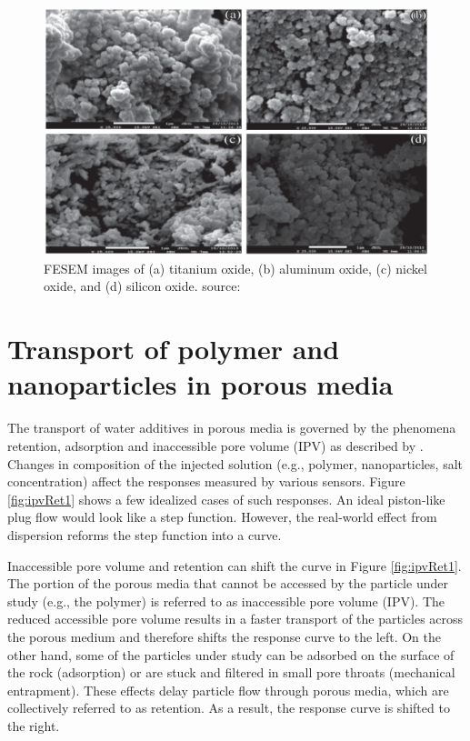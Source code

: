 \begin{figure}
    \centering
    \includegraphics[width=\textwidth]{img/fig/npFesem.png}
    \caption{FESEM images of (a) titanium oxide, (b) aluminum oxide, (c) nickel oxide, and (d) silicon oxide. source: \citet{Alomair2015} }
    \label{fig:npFesem}
\end{figure}



\section{Transport of polymer and nanoparticles in porous media}
The transport of water additives in porous media  is governed by the phenomena  retention, adsorption  and inaccessible pore volume  (IPV) as described by \citep{Lotsch1985}. Changes in composition of the injected solution (e.g., polymer, nanoparticles, salt concentration) affect the responses measured by various sensors. Figure \ref{fig:ipvRet1} shows a few idealized cases of such responses. An ideal piston-like plug flow would look like a step function. However, the real-world effect from dispersion reforms the step function into a curve.

Inaccessible pore volume and retention can shift the curve in Figure \ref{fig:ipvRet1}. The portion of the porous media that cannot be accessed by the particle under study (e.g., the polymer) is referred to as inaccessible pore volume (IPV). The reduced accessible pore volume results in a faster transport of the particles across the porous medium and therefore shifts the response curve to the left. On the other hand, some of the particles under study can be adsorbed on the surface of the rock (adsorption) or are stuck and filtered in small pore throats  (mechanical entrapment). These effects delay particle flow through porous media, which are collectively referred to as  retention. As a result, the response curve is shifted to the right. 


